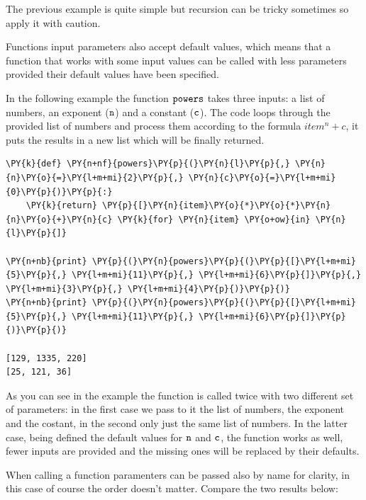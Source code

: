 The previous example is quite simple but recursion can be tricky sometimes so apply it with caution. 

Functions input parameters also accept default values, which means that a function that works with some input values can be called with less parameters provided their default values have been specified.

In the following example the function $\tt{powers}$ takes three inputs: a list of numbers, an exponent ($\tt{n}$) and a constant ($\tt{c}$). The code loops through the provided list of numbers and process them according to the formula $item^{n} + c$, it puts the results in a new list which will be finally returned.

\begin{tcolorbox}[breakable, size=fbox, boxrule=1pt, pad at break*=1mm,colback=cellbackground, colframe=cellborder]
\begin{Verbatim}[commandchars=\\\{\}]
\PY{k}{def} \PY{n+nf}{powers}\PY{p}{(}\PY{n}{l}\PY{p}{,} \PY{n}{n}\PY{o}{=}\PY{l+m+mi}{2}\PY{p}{,} \PY{n}{c}\PY{o}{=}\PY{l+m+mi}{0}\PY{p}{)}\PY{p}{:}
    \PY{k}{return} \PY{p}{[}\PY{n}{item}\PY{o}{*}\PY{o}{*}\PY{n}{n}\PY{o}{+}\PY{n}{c} \PY{k}{for} \PY{n}{item} \PY{o+ow}{in} \PY{n}{l}\PY{p}{]}

\PY{n+nb}{print} \PY{p}{(}\PY{n}{powers}\PY{p}{(}\PY{p}{[}\PY{l+m+mi}{5}\PY{p}{,} \PY{l+m+mi}{11}\PY{p}{,} \PY{l+m+mi}{6}\PY{p}{]}\PY{p}{,} \PY{l+m+mi}{3}\PY{p}{,} \PY{l+m+mi}{4}\PY{p}{)}\PY{p}{)}
\PY{n+nb}{print} \PY{p}{(}\PY{n}{powers}\PY{p}{(}\PY{p}{[}\PY{l+m+mi}{5}\PY{p}{,} \PY{l+m+mi}{11}\PY{p}{,} \PY{l+m+mi}{6}\PY{p}{]}\PY{p}{)}\PY{p}{)}

[129, 1335, 220]
[25, 121, 36]
\end{Verbatim}
\end{tcolorbox}
    
As you can see in the example the function is called twice with two different set of parameters: in the first case we pass to it the list of numbers, the exponent and the costant, in the second only just the same list of numbers.
In the latter case, being defined the default values for $\tt{n}$ and $\tt{c}$, the function works as well, fewer inputs are provided and the missing ones will be replaced by their defaults. 

When calling a function paramenters can be passed also by name for clarity, in this case of course the order doesn't matter. Compare the two results below:

